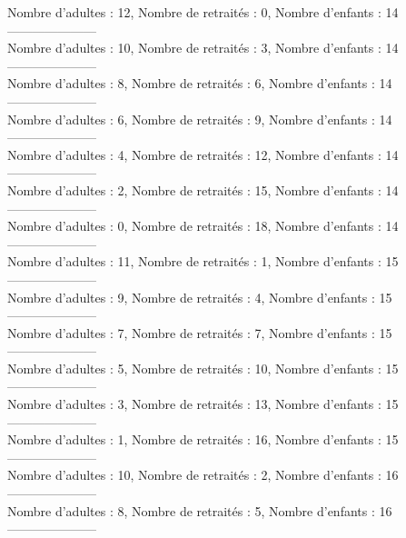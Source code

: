 \documentclass[10pt,a4paper]{article}
\begin{document}
Nombre d'adultes : 12, Nombre de retraités : 0, Nombre d'enfants : 14\\
---------------------\\
Nombre d'adultes : 10, Nombre de retraités : 3, Nombre d'enfants : 14\\
---------------------\\
Nombre d'adultes : 8, Nombre de retraités : 6, Nombre d'enfants : 14\\
---------------------\\
Nombre d'adultes : 6, Nombre de retraités : 9, Nombre d'enfants : 14\\
---------------------\\
Nombre d'adultes : 4, Nombre de retraités : 12, Nombre d'enfants : 14\\
---------------------\\
Nombre d'adultes : 2, Nombre de retraités : 15, Nombre d'enfants : 14\\
---------------------\\
Nombre d'adultes : 0, Nombre de retraités : 18, Nombre d'enfants : 14\\
---------------------\\
Nombre d'adultes : 11, Nombre de retraités : 1, Nombre d'enfants : 15\\
---------------------\\
Nombre d'adultes : 9, Nombre de retraités : 4, Nombre d'enfants : 15\\
---------------------\\
Nombre d'adultes : 7, Nombre de retraités : 7, Nombre d'enfants : 15\\
---------------------\\
Nombre d'adultes : 5, Nombre de retraités : 10, Nombre d'enfants : 15\\
---------------------\\
Nombre d'adultes : 3, Nombre de retraités : 13, Nombre d'enfants : 15\\
---------------------\\
Nombre d'adultes : 1, Nombre de retraités : 16, Nombre d'enfants : 15\\
---------------------\\
Nombre d'adultes : 10, Nombre de retraités : 2, Nombre d'enfants : 16\\
---------------------\\
Nombre d'adultes : 8, Nombre de retraités : 5, Nombre d'enfants : 16\\
---------------------\\
\end{document}
